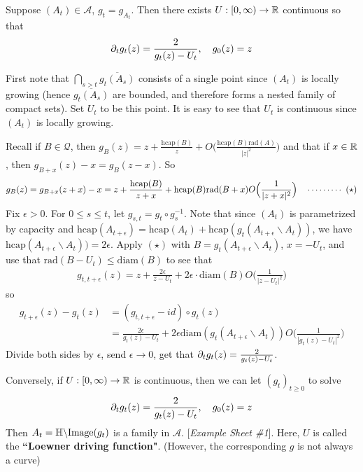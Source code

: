 \documentclass[12pt,a4paper]{article}
\newenvironment{proof}
{\begin{changemargin}{0.5cm}{0.5cm} 
	}%
	{\end{changemargin}
}
\newenvironment{p}
{\begin{proof} 
	}%
	{\end{proof}
}
\begin{document}
\prop Suppose $(A_t) \in \mathscr{A}$, $g_t = g_{A_t}$. Then there exists $U :[0, \infty) \rightarrow \mathbb{R}$ continuous so that
\begin{align*}
\partial_t g_t(z) = \frac{2}{g_t(z)- U_t}, \quad g_0(z)=z
\end{align*}
\begin{p}
\pf First note that $\bigcap_{s>t} \overline{g_t(A_s)}$ consists of a single point since $(A_t)$ is locally growing (hence $\overline{g_t(A_s)}$ are bounded, and therefore forms a nested family of compact sets). Set $U_t$ to be this point. It is easy to see that $U_t$ is continuous since $(A_t)$ is locally growing. 

\quad Recall if $B\in \mathscr{Q}$, then $g_B(z) = z+ \frac{\text{hcap}(B)}{z} + O \Big( \frac{\text{hcap}(B)\text{rad}(A)}{|z|^2} \Big)$ and that if $x\in \mathbb{R}$, then $g_{B+x}(z)-x = g_B(z-x)$. So
\begin{align*}
g_B(z) = g_{B+x}(z+x)-x = z+ \frac{\text{hcap}(B)}{z+x}+ \text{hcap}(B)\text{rad}(B+x) O \Big(\frac{1}{|z+x|^2}\Big) \quad \cdots\cdots\cdots\,\,(\star)
\end{align*}
Fix $\epsilon >0$. For $0\leq s\leq t$, let $g_{s,t} = g_t \circ g_s^{-1}$. Note that since $(A_t)$ is parametrized by capacity and $\text{hcap}(A_{t+ \epsilon}) = \text{hcap}(A_t) + \text{hcap}(g_t(A_{t+\epsilon} \backslash A_t ))$, we have $\text{hcap}(A_{t+\epsilon} \backslash A_t )) = 2\epsilon$. Apply $(\star)$ with $B = g_t(A_{t+ \epsilon}\backslash A_t)$, $x= -U_t$, and use that $\text{rad}(B-U_t) \leq \text{diam}(B)$ to see that
\begin{align*}
g_{t, t+\epsilon}(z) = z+ \frac{2\epsilon}{z-U_t} + 2\epsilon \cdot \text{diam}(B) O\Big(\frac{1}{|z-U_t|^2}\Big)
\end{align*}
so
\begin{align*}
g_{t+\epsilon}(z) - g_t(z) &= (g_{t, t+\epsilon} - id) \circ g_t (z) \\
& = \frac{2\epsilon}{g_t(z)- U_t} + 2\epsilon \text{diam}(g_t(A_{t+\epsilon}\backslash A_t)) O\Big(\frac{1}{|g_t(z)- U_t|^2} \Big)
\end{align*}
Divide both sides by $\epsilon$, send $\epsilon \rightarrow 0$, get that $\partial_t g_t(z) = \frac{2}{g_t(z)- U_t}$.

\eop
\end{p}
\s

Conversely, if $U: [0, \infty )\rightarrow \mathbb{R}$ is continuous, then we can let $(g_t)_{t\geq 0}$ to solve
\begin{align*}
\partial_t g_t(z) = \frac{2}{g_t(z) - U_t}, \quad g_0(z)=z
\end{align*}
Then $A_t = \mathbb{H} \backslash \text{Image}(g_t)$ is a family in $\mathscr{A}$. [\emph{Example Sheet \#1}]. Here, $U$ is called the \textbf{``Loewner driving function"}. (However, the corresponding $g$ is not always a curve)
\s
\end{document}
